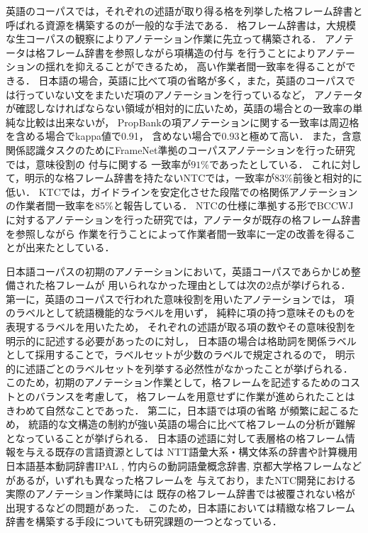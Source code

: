 \documentclass[japanese]{jnlp_1.4}
\begin{document}
英語のコーパスでは，それぞれの述語が取り得る格を列挙した格フレーム辞書と呼ばれる資源を構築するのが一般的な手法である．
格フレーム辞書は，大規模な生コーパスの観察によりアノテーション作業に先立って構築される．
アノテータは格フレーム辞書を参照しながら項構造の付与
を行うことによりアノテーションの揺れを抑えることができるため，
高い作業者間一致率を得ることができる．
日本語の場合，英語に比べて項の省略が多く，また，英語のコーパスでは行っていない文をまたいだ項のアノテーションを行っているなど，
アノテータが確認しなければならない領域が相対的に広いため，英語の場合との一致率の単純な比較は出来ないが，
PropBankの項アノテーションに関する一致率は周辺格を含める場合でkappa値で0.91，
含めない場合で0.93と極めて高い\cite{palmer2005pba}．
また，含意関係認識タスクのためにFrameNet準拠のコーパスアノテーションを行った研究では，意味役割の
付与に関する
一致率が$91\%$であったとしている\cite{burchardt2008fate}．
これに対して，明示的な格フレーム辞書を持たないNTCでは，一致率が$83\%$前後と相対的に低い．
KTCでは，ガイドラインを安定化させた段階での格関係アノテーションの作業者間一致率を$85\%$と報告している\cite{河原大輔2002関係}．
NTCの仕様に準拠する形でBCCWJに対するアノテーションを行った研究では，アノテータが既存の格フレーム辞書を参照しながら
作業を行うことによって作業者間一致率に一定の改善を得ることが出来たとしている\cite{komachi2011}．

日本語コーパスの初期のアノテーションにおいて，英語コーパスであらかじめ整備された格フレームが
用いられなかった理由としては次の2点が挙げられる．
第一に，英語のコーパスで行われた意味役割を用いたアノテーションでは，
項のラベルとして統語機能的なラベルを用いず，
純粋に項の持つ意味そのものを表現するラベルを用いたため，
それぞれの述語が取る項の数やその意味役割を明示的に記述する必要があったのに対し，
日本語の場合は格助詞を関係ラベルとして採用することで，ラベルセットが少数のラベルで規定されるので，
明示的に述語ごとのラベルセットを列挙する必然性がなかったことが挙げられる．
このため，初期のアノテーション作業として，格フレームを記述するためのコストとのバランスを考慮して，
格フレームを用意せずに作業が進められたことはきわめて自然なことであった．
第二に，日本語では項の省略
が頻繁に起こるため，
統語的な文構造の制約が強い英語の場合に比べて格フレームの分析が難解となっていることが挙げられる．
日本語の述語に対して表層格の格フレーム情報を与える既存の言語資源としては
NTT語彙大系・構文体系の辞書\cite{nttlexicon}や計算機用日本語基本動詞辞書IPAL \cite{ipal}, 
竹内らの動詞語彙概念辞書\cite{takeuchi2005}, 
京都大学格フレーム\cite{kawahara2006case}などがあるが，いずれも異なった格フレームを
与えており，またNTC開発における実際のアノテーション作業時には
既存の格フレーム辞書では被覆されない格が出現するなどの問題があった．
このため，日本語においては精緻な格フレーム辞書を構築する手段についても研究課題の一つとなっている．
\end{document}
